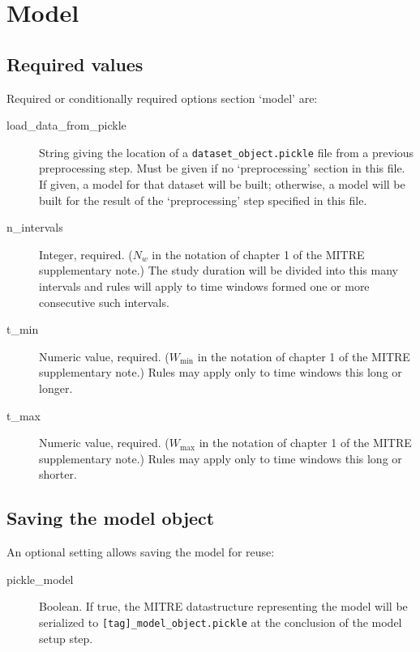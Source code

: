 \documentclass[12pt]{report}
\begin{document}
\section{Model}\label{model}
\subsection{Required values}
Required or conditionally required options section `model' are:
\begin{description}
\item[load\_data\_from\_pickle] String giving the location of a
  \texttt{dataset\_object.pickle} file from a previous preprocessing
  step. Must be given if no `preprocessing' section in this file. If
  given, a model for that dataset will be built; otherwise, a model
  will be built for the result of the `preprocessing' step specified
  in this file.
\item[n\_intervals] Integer, required. ($N_w$ in the notation of
  chapter 1 of the MITRE supplementary note.) The study duration will
  be divided into this many intervals and rules will apply to time
  windows formed one or more consecutive such intervals.
\item[t\_min] Numeric value, required. ($W_\text{min}$ in the notation of
  chapter 1 of the MITRE supplementary note.) Rules may apply only
  to time windows this long or longer.
\item[t\_max] Numeric value, required. ($W_\text{max}$ in the notation of
  chapter 1 of the MITRE supplementary note.) Rules may apply only
  to time windows this long or shorter.
\end{description}

\subsection{Saving the model object}
An optional setting allows saving the model for reuse:
\begin{description}
\item[pickle\_model] Boolean. If true, the MITRE datastructure
  representing the model will be serialized to
  \texttt{[tag]\_model\_object.pickle} at the conclusion of the model
  setup step.
\end{description}
\end{document}
